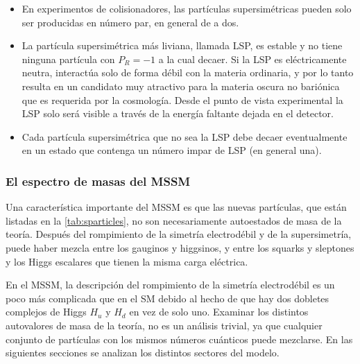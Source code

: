 \begin{itemize}
\item En experimentos de colisionadores, las partículas supersimétricas pueden
  solo ser producidas en número par, en general de a dos.
\item La partícula supersimétrica más liviana, llamada LSP, es estable y no tiene
  ninguna partícula con $P_R = -1$ a la cual decaer. Si
  la LSP es eléctricamente neutra, interactúa solo de forma débil con la materia
  ordinaria, y por lo tanto resulta en un candidato muy atractivo para la
  materia oscura no bariónica que es requerida por la cosmología. Desde el punto de
  vista experimental la LSP solo será visible a través de la energía faltante
  dejada en el detector.
\item Cada partícula supersimétrica que no sea la LSP debe decaer eventualmente
  en un estado que contenga un número impar de LSP (en general una).
\end{itemize}


\subsubsection{El espectro de masas del MSSM}
\label{sec:mssm_masses}

Una característica importante del MSSM es que las nuevas partículas, que están
listadas en la \cref{tab:sparticles}, no son necesariamente autoestados de masa
de la teoría. Después del rompimiento de la simetría electrodébil
y de la supersimetría, puede haber mezcla entre los gauginos y higgsinos, y
entre los squarks y sleptones y los Higgs escalares que tienen la misma carga
eléctrica.

En el MSSM, la descripción del rompimiento de la simetría electrodébil es un
poco más complicada que en el SM debido al hecho de que hay dos dobletes
complejos de Higgs $H_u$ y $H_d$ en vez de solo uno.
Examinar los distintos autovalores de masa de la teoría, no es un análisis
trivial, ya que cualquier conjunto de partículas con los mismos números
cuánticos puede mezclarse. En las siguientes secciones se analizan los distintos
sectores del modelo.




